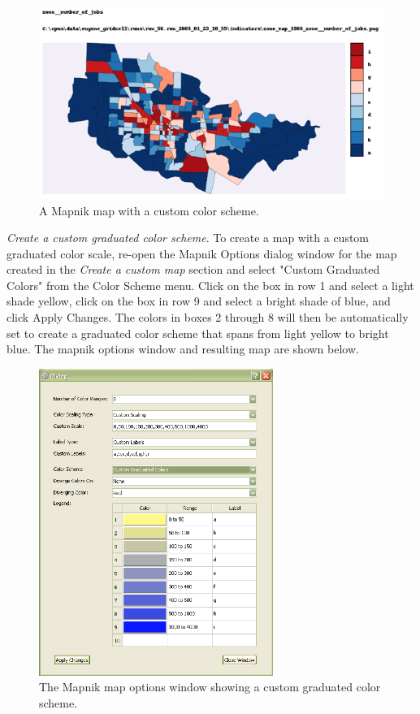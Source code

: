 \begin{figure}[hbp]
\begin{center}
\includegraphics[width=\textwidth]{part-gui/images/sample-map-custom-settings.png}
\end{center}
\caption{A Mapnik map with a custom color scheme.}
\label{fig:sample-map-custom-settings}
\end{figure}
\clearpage

\emph{Create a custom graduated color scheme}. 
To create a map with a custom graduated color scale, 
re-open the Mapnik Options dialog window for the map 
created in the \emph{Create a custom map} section and select 
"Custom Graduated Colors" from the Color Scheme menu.  Click 
on the box in row 1 and select a light shade yellow, click on 
the box in row 9 and select a bright shade of blue, and click 
Apply Changes. The colors in boxes 2 through 8 will then be automatically set 
to create a graduated color scheme that spans from light 
yellow to bright blue. The mapnik options window and resulting 
map are shown below.

\begin{figure}[htp]
\begin{center}
\includegraphics[width=3in]{part-gui/images/result-manager-mapnik-options-example-2.png}
\end{center}
\caption{The Mapnik map options window showing a custom graduated color scheme.}
\label{fig:result-manager-mapnik-options-example-2}
\end{figure}


